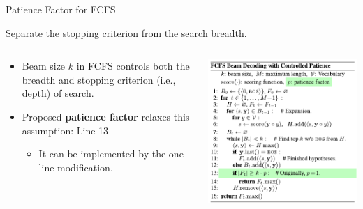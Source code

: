 \documentclass[t, unicode, 12pt, xdvipdfmx, aspectratio=169, bxjsarticle]{beamer}
\begin{document}
\begin{frame}[label={sec:org7fc7405}]{Patience Factor for FCFS}
\vspace{-0.2cm}
\begin{block}{Separate the stopping criterion from the search breadth.}
\begin{columns}
\begin{column}{0.5\columnwidth}
\begin{itemize}
\item Beam size \(k\) in FCFS controls both the breadth and stopping criterion (i.e., depth) of search.
\item Proposed \textbf{patience factor} relaxes this assumption: \colorbox{green!25}{Line 13}
\begin{itemize}
\item It can be implemented by the one-line modification.
\end{itemize}
\end{itemize}
\end{column}

\begin{column}{0.5\columnwidth}
\vspace{-0.3cm}
\begin{center}
\includegraphics[width=0.95\linewidth]{./figure/FCFS.pdf}
\end{center}
\end{column}
\end{columns}
\end{block}
\end{frame}
\end{document}
